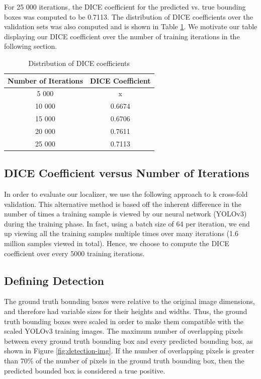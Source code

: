 \documentclass[12pt]{article}
\begin{document}
For 25 000 iterations, the DICE coefficient for the predicted vs. true bounding boxes was computed to be 0.7113. The distribution of DICE coefficients over the validation sets was also computed and is shown in Table \ref{table:dice-table}. We motivate our table displaying our DICE coefficient over the number of training iterations in the following section.

    \begin{table}[h] 
    \centering
        \begin{tabular}{ | c | c |}
            \hline
            Number of Iterations    & DICE Coefficient \\
            \hline
            5 000                   &  x \\
            10 000                  &  0.6674    \\
            15 000                  &  0.6706  \\
            20 000                  &  0.7611 \\
            25 000                  &  0.7113    \\
            \hline
        \end{tabular}
    \caption{Distribution of DICE coefficients}
    \label{table:dice-table}
    \end{table}

\subsection{DICE Coefficient versus Number of Iterations}

In order to evaluate our localizer, we use the following approach to k cross-fold validation. This alternative method is based off the inherent difference in the number of times a training sample is viewed by our neural network (YOLOv3) during the training phase. In fact, using a batch size of 64 per iteration, we end up viewing all the training samples multiple times over many iterations (1.6 million samples viewed in total). Hence, we choose to compute the DICE coefficient over every 5000 training iterations.

\subsection{Defining Detection} 

The ground truth bounding boxes were relative to the original image dimensions, and therefore had variable sizes for their heights and widths. Thus, the ground truth bounding boxes were scaled in order to make them compatible with the scaled YOLOv3 training images. The maximum number of overlapping pixels between every ground truth bounding box and every predicted bounding box, as shown in Figure \ref{fig:detection-img}. If the number of overlapping pixels is greater than 70\% of the number of pixels in the ground truth bounding box, then the predicted bounded box is considered a true positive.
\end{document}
